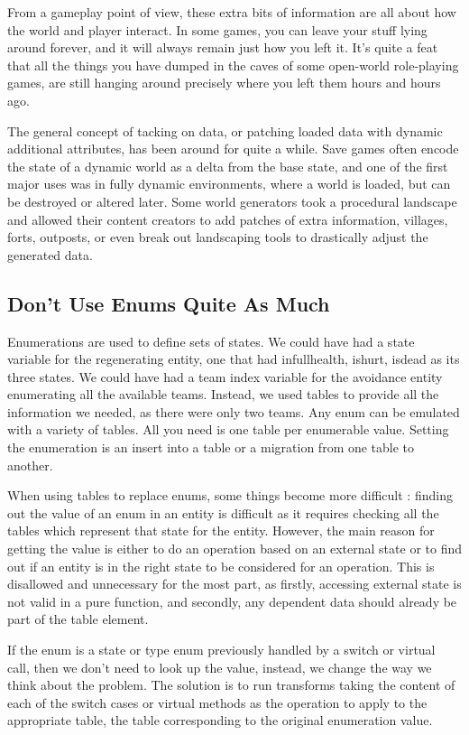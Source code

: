 \documentclass[a4paper,12pt]{article}
\begin{document}
From a gameplay point of view, these extra bits of information are all about how the world and player interact.
In some games, you can leave your stuff lying around forever, and it will always remain just how you left it.
It's quite a feat that all the things you have dumped in the caves of some open-world role-playing games, are still hanging around precisely where you left them hours and hours ago.

The general concept of tacking on data, or patching loaded data with dynamic additional attributes, has been around for quite a while.
Save games often encode the state of a dynamic world as a delta from the base state, and one of the first major uses was in fully dynamic environments, where a world is loaded, but can be destroyed or altered later.
Some world generators took a procedural landscape and allowed their content creators to add patches of extra information, villages, forts, outposts, or even break out landscaping tools to drastically adjust the generated data.

\subsection{Don't Use Enums Quite As Much}

Enumerations are used to define sets of states.
We could have had a state variable for the regenerating entity, one that had infullhealth, ishurt, isdead as its three states.
We could have had a team index variable for the avoidance entity enumerating all the available teams.
Instead, we used tables to provide all the information we needed, as there were only two teams.
Any enum can be emulated with a variety of tables.
All you need is one table per enumerable value.
Setting the enumeration is an insert into a table or a migration from one table to another.

When using tables to replace enums, some things become more difficult :
finding out the value of an enum in an entity is difficult as it requires checking all the tables which represent that state for the entity.
However, the main reason for getting the value is either to do an operation based on an external state or to find out if an entity is in the right state to be considered for an operation.
This is disallowed and unnecessary for the most part, as firstly, accessing external state is not valid in a pure function, and secondly, any dependent data should already be part of the table element.

If the enum is a state or type enum previously handled by a switch or virtual call, then we don't need to look up the value, instead, we change the way we think about the problem.
The solution is to run transforms taking the content of each of the switch cases or virtual methods as the operation to apply to the appropriate table, the table corresponding to the original enumeration value.
\end{document}
